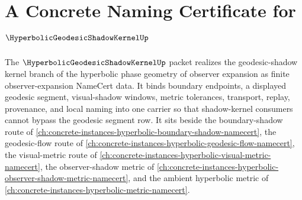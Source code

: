 \chapter{A Concrete Naming Certificate for $\HyperbolicGeodesicShadowKernelUp$}
\label{ch:concrete-instances-hyperbolic-geodesic-shadow-kernel-namecert}

The $\HyperbolicGeodesicShadowKernelUp$ packet realizes the geodesic-shadow kernel branch of the hyperbolic phase geometry of observer expansion as finite observer-expansion NameCert data. It binds boundary endpoints, a displayed geodesic segment, visual-shadow windows, metric tolerances, transport, replay, provenance, and local naming into one carrier so that shadow-kernel consumers cannot bypass the geodesic segment row. It sits beside the boundary-shadow route of \autoref{ch:concrete-instances-hyperbolic-boundary-shadow-namecert}, the geodesic-flow route of \autoref{ch:concrete-instances-hyperbolic-geodesic-flow-namecert}, the visual-metric route of \autoref{ch:concrete-instances-hyperbolic-visual-metric-namecert}, the observer-shadow metric of \autoref{ch:concrete-instances-hyperbolic-observer-shadow-metric-namecert}, and the ambient hyperbolic metric of \autoref{ch:concrete-instances-hyperbolic-metric-namecert}.

